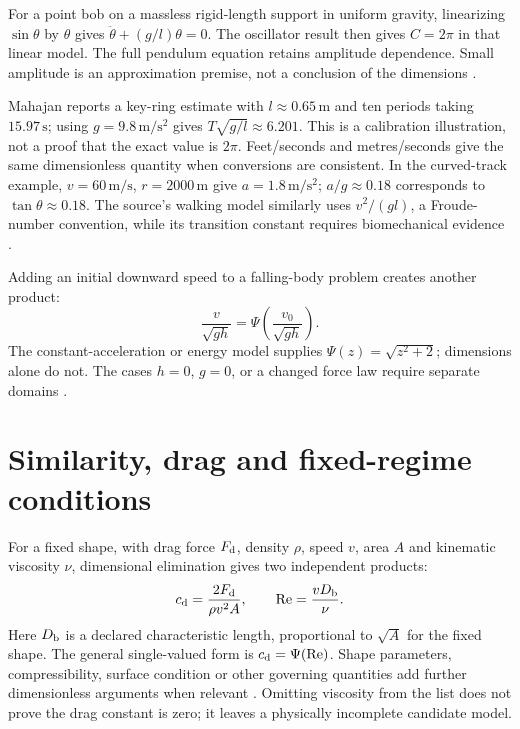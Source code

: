 For a point bob on a massless rigid-length support in uniform gravity,
linearizing \(\sin\theta\) by \(\theta\) gives
\(\ddot\theta+(g/l)\theta=0\).
The oscillator result then gives \(C=2\pi\) in that linear model.
The full pendulum equation retains amplitude dependence. Small amplitude
is an approximation premise, not a conclusion of the dimensions
\cite[5.2.1]{Mahajan2014Insight}.

Mahajan reports a key-ring estimate with \(l\approx0.65\,\mathrm m\)
and ten periods taking \(15.97\,\mathrm s\); using \(g=9.8\,\mathrm{m/s^2}\)
gives \(T\sqrt{g/l}\approx6.201\).
This is a calibration illustration, not a proof that the exact value is
\(2\pi\). Feet/seconds and metres/seconds give the same dimensionless
quantity when conversions are consistent. In the curved-track example,
\(v=60\,\mathrm{m/s}\), \(r=2000\,\mathrm m\) give \(a=1.8\,\mathrm{m/s^2}\);
\(a/g\approx0.18\) corresponds to \(\tan\theta\approx0.18\).
The source's walking model similarly uses \(v^2/(gl)\), a Froude-number
convention, while its transition constant requires biomechanical evidence
\cite[5.1.1--5.2.1]{Mahajan2014Insight}.

Adding an initial downward speed to a falling-body problem creates another
product:
\[
 \frac{v}{\sqrt{gh}}=\Psi\!\left(\frac{v_0}{\sqrt{gh}}\right).
\]
The constant-acceleration or energy model supplies
\(\Psi(z)=\sqrt{z^2+2}\); dimensions alone do not.
The cases \(h=0\), \(g=0\), or a changed force law require separate domains
\cite[5.3]{Mahajan2014Insight}.

\section{Similarity, drag and fixed-regime conditions}
\label{sec:p15-dimensional-drag}

For a fixed shape, with drag force \(F_{\rm d}\), density \(\rho\),
speed \(v\), area \(A\) and kinematic viscosity \(\nu\),
dimensional elimination gives two independent products:
\[
 c_{\rm d}=\frac{2F_{\rm d}}{\rho v^2 A},\qquad
 \mathrm{Re}=\frac{vD_{\rm b}}{\nu}.
\]
Here \(D_{\rm b}\) is a declared characteristic length, proportional to
\(\sqrt A\) for the fixed shape. The general single-valued form is
\(c_{\rm d}=\Psi(\mathrm{Re})\). Shape parameters, compressibility,
surface condition or other governing quantities add further dimensionless
arguments when relevant \cite[5.3.2]{Mahajan2014Insight}.
Omitting viscosity from the list does not prove the drag constant is zero;
it leaves a physically incomplete candidate model.

